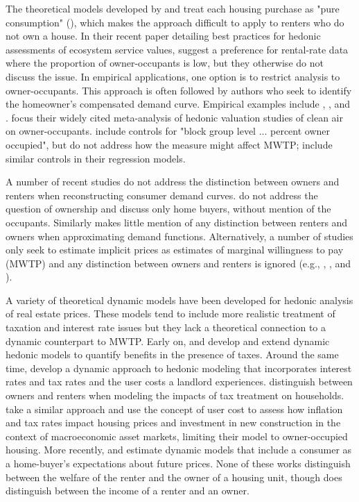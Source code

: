 \documentclass[ecta,nameyear,draft]{econsocart}
\theoremstyle{plain}
\theoremstyle{remark}
\begin{document}
The theoretical models developed by \cite{rosen74} and \cite{freeman74} treat each housing purchase as "pure consumption" (\cite{rosen74}), which makes the approach difficult to apply to renters who do not own a house. In their recent paper detailing best practices for hedonic assessments of ecosystem service values, \cite{bishop20} suggest a preference for rental-rate data where the proportion of owner-occupants is low, but they otherwise do not discuss the issue. In empirical applications, one option is to restrict analysis to owner-occupants. This approach is often followed by authors who seek to identify the homeowner's compensated demand curve. Empirical examples include \cite{palmquist84}, \cite{zabelkiel00}, and \cite{chaygreenstone05}. \cite{smithhuang95} focus their widely cited meta-analysis of hedonic valuation studies of clean air on owner-occupants. \cite{kuminoffpope14} include controls for "block group level ... percent owner occupied", but do not address how the measure might affect MWTP; \cite{chaygreenstone05} include similar controls in their regression models.
 
A number of recent studies do not address the distinction between owners and renters when reconstructing consumer demand curves. \cite{bishoptimmins18} do not address the question of ownership and discuss only home buyers, without mention of the occupants. Similarly \cite{banzhaf20} makes little mention of any distinction between renters and owners when approximating demand functions. Alternatively, a number of studies only seek to estimate implicit prices as estimates of marginal willingness to pay (MWTP) and any distinction between owners and renters is ignored (e.g., \cite{bajari12}, \cite{bui03}, and \cite{kuminoffpope14}).

A variety of theoretical dynamic models have been developed for hedonic analysis of real estate prices. These models tend to include more realistic treatment of taxation and interest rate issues but they lack a theoretical connection to a dynamic counterpart to MWTP. Early on, \cite{niskanen77} and \cite{freeman80} develop and extend dynamic hedonic models to quantify benefits in the presence of taxes. Around the same time, \cite{sonstelie80} develop a dynamic approach to hedonic modeling that incorporates interest rates and tax rates and the user costs a landlord experiences. \cite{hendershott83} distinguish between owners and renters when modeling the impacts of tax treatment on households. \cite{poterba84} take a similar approach and use the concept of user cost to assess how inflation and tax rates impact housing prices and investment in new construction in the context of macroeconomic asset markets, limiting their model to owner-occupied housing. More recently, \cite{bishop11} and \cite{bishop19} estimate dynamic models that include a consumer as a home-buyer's expectations about future prices. None of these works distinguish between the welfare of the renter and the owner of a housing unit, though \cite{hendershott83} does distinguish between the income of a renter and an owner. 
\end{document}
